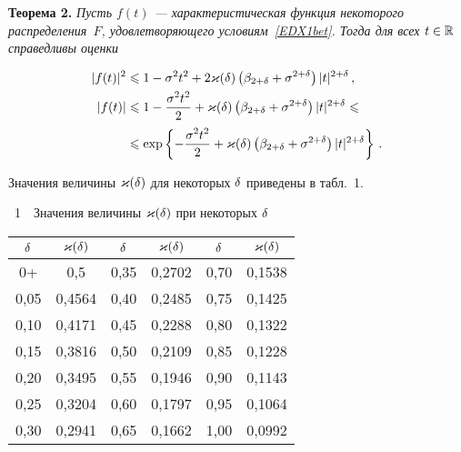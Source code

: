 \begin{multicols}{2}
\medskip

\noindent
\textbf{Теорема 2.}
\textit{Пусть $f(t)$ --- характеристическая функция некоторого распределения~$F$,
удовлетворяющего условиям~\eqref{EDX1bet}. Тогда для всех
$t\in\mathbb R$ справедливы оценки}

\noindent
\begin{align*}
|f(t)|^2&\leqslant 1-\sigma^2t^2+2\varkappa(\delta)\left(\beta_{2+\delta}+
\sigma^{2+\delta}\right)|t|^{2+\delta}\,,\\
|f(t)|&\leqslant 1-\displaystyle\frac{\displaystyle \sigma^2t^2\mathstrut}{\displaystyle 2\mathstrut}+\varkappa(\delta)\left(\beta_{2+\delta}+
\sigma^{2+\delta}\right)|t|^{2+\delta}\leqslant{}\\
&{}\leqslant \exp\left\{-\displaystyle\frac{\displaystyle \sigma^2t^2\mathstrut}{\displaystyle 2\mathstrut}+
\varkappa(\delta)\left(\beta_{2+\delta}+
\sigma^{2+\delta}\right)|t|^{2+\delta}\right\}\,.
\end{align*}

\medskip

Значения величины $\varkappa(\delta)$ для некоторых $\delta$ приведены в
табл.~1.

\bigskip

\begin{center} %
\noindent
{{\tablename~1}\ \ \small{Значения величины $\varkappa(\delta)$ при некоторых $\delta$}}
\end{center}

\begin{center}
\tabcolsep=7pt
\begin{tabular}{|c|c||c|c||c|c|}
\hline
$\delta$ & $\varkappa(\delta)$ & $\delta $&$ \varkappa(\delta)$ &$ \delta$ & $\varkappa(\delta)$ \\
\hline
0+   & 0,5\hphantom{999}    & 0,35 & 0,2702 & 0,70 & 0,1538 \\
0,05 & 0,4564 & 0,40 & 0,2485 & 0,75 & 0,1425 \\
0,10 & 0,4171 & 0,45 & 0,2288 & 0,80 & 0,1322 \\
0,15 & 0,3816 & 0,50 & 0,2109 & 0,85 & 0,1228 \\
0,20 & 0,3495 & 0,55 & 0,1946 & 0,90 & 0,1143 \\
0,25 & 0,3204 & 0,60 & 0,1797 & 0,95 & 0,1064 \\
0,30 & 0,2941 & 0,65 & 0,1662 & 1,00 & 0,0992 \\
\hline
\end{tabular}
\end{center}
\vspace*{6pt}


\bigskip
\addtocounter{table}{1}


\end{multicols}

